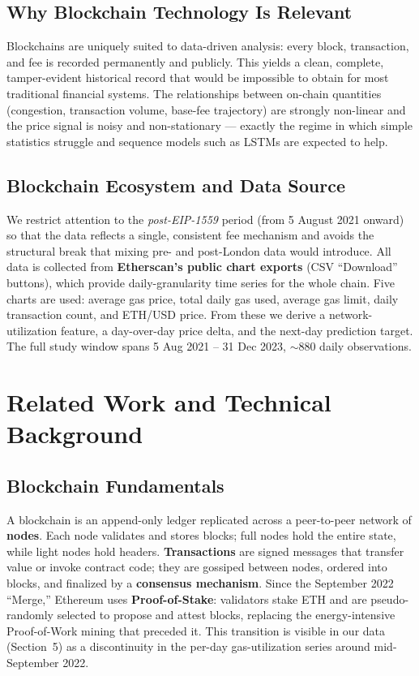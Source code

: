 \documentclass[11pt,a4paper]{article}
\begin{document}
\subsection{Why Blockchain Technology Is Relevant}
Blockchains are uniquely suited to data-driven analysis: every block, transaction, and fee is
recorded permanently and publicly. This yields a clean, complete, tamper-evident historical
record that would be impossible to obtain for most traditional financial systems. The
relationships between on-chain quantities (congestion, transaction volume, base-fee trajectory)
are strongly non-linear and the price signal is noisy and non-stationary --- exactly the regime
in which simple statistics struggle and sequence models such as LSTMs are expected to help.

\subsection{Blockchain Ecosystem and Data Source}
We restrict attention to the \emph{post-EIP-1559} period (from 5 August 2021 onward) so that the
data reflects a single, consistent fee mechanism and avoids the structural break that mixing
pre- and post-London data would introduce. All data is collected from \textbf{Etherscan's public
chart exports} (CSV ``Download'' buttons), which provide daily-granularity time series for the
whole chain. Five charts are used: average gas price, total daily gas used, average gas limit,
daily transaction count, and ETH/USD price. From these we derive a network-utilization feature,
a day-over-day price delta, and the next-day prediction target. The full study window spans
5 Aug 2021 -- 31 Dec 2023, $\sim$880 daily observations.

\section{Related Work and Technical Background}

\subsection{Blockchain Fundamentals}
A blockchain is an append-only ledger replicated across a peer-to-peer network of \textbf{nodes}.
Each node validates and stores blocks; full nodes hold the entire state, while light nodes hold
headers. \textbf{Transactions} are signed messages that transfer value or invoke contract code;
they are gossiped between nodes, ordered into blocks, and finalized by a \textbf{consensus
mechanism}. Since the September 2022 ``Merge,'' Ethereum uses \textbf{Proof-of-Stake}: validators
stake ETH and are pseudo-randomly selected to propose and attest blocks, replacing the
energy-intensive Proof-of-Work mining that preceded it. This transition is visible in our data
(Section~5) as a discontinuity in the per-day gas-utilization series around mid-September 2022.
\end{document}
